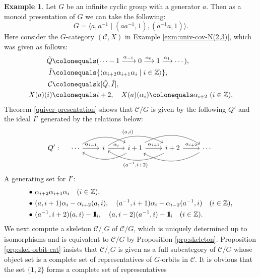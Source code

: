 \documentclass{surv-l}
\numberwithin{equation}{chapter}
\numberwithin{figure}{chapter}
\theoremstyle{plain}
\theoremstyle{definition}
\newtheorem{exm}[thm]{Example}
\theoremstyle{remark}
\newcommand{\id}{1\kern-.25em{\text{{\rm l}}}}
\newcommand{\corbit}{/\!_{_{\mathrm{c}}}}
\newcommand{\Ar}[3]{\ar[from={#1}, to={#2}, #3]}
\begin{document}
\begin{exm}\label{exm:orb-cat-univ-cov-N(2,3)}
Let $G$ be an infinite cyclic group with a generator $a$.
Then as a monoid presentation of $G$ we can take the following:
\[
G = {\langle a, a^{-1} \mid (aa^{-1}, 1), (a^{-1} a, 1) \rangle}.
\]
Here consider the $G$-category $({\mathcal{C}}, X)$ in Example \ref{exm:univ-cov-N(2,3)},
which was given as follows:
\[
\begin{aligned}
\tilde{Q}&\colonequals (\cdots -1\xrightarrow{\alpha_{-1}}0\xrightarrow{\alpha_0}1\xrightarrow{\alpha_1}\cdots),\\
\tilde{I}&\colonequals {\langle\alpha_{i+2}\alpha_{i+1}\alpha_{i} \mid i \in \mathbb{Z} \rangle},\\
{\mathcal{C}}&\colonequals  \Bbbk[\tilde{Q}, \tilde{I}],\\
X(a)(i)&\colonequals  i+2,\quad X(a)(\alpha_i)\colonequals  \alpha_{i+2}\ (i \in \mathbb{Z}).
\end{aligned}
\]
Theorem \ref{quiver-presentation} shows that ${\mathcal{C}}/G$
is given by the following $Q'$ and the ideal $I'$ generated by the relations below:
\[
Q':\quad
\begin{tikzcd}
\cdots & i & i+1 & i+2 & \cdots
\Ar{1-1}{1-2}{"\alpha_{i-1}"}
\Ar{1-2}{1-3}{"\alpha_i"}
\Ar{1-3}{1-4}{"\alpha_{i+1}"}
\Ar{1-4}{1-5}{"\alpha_{i+2}"}
\Ar{1-2}{1-4}{"{(a, i)}", bend left=30}
\Ar{1-4}{1-2}{"{(a^{-1}, i+2)}", bend left=30}
\Ar{1-3}{1-5}{bend left=30}
\Ar{1-5}{1-3}{bend left=30}
\Ar{1-1}{1-3}{bend left=30}
\Ar{1-3}{1-1}{bend left=30}
\end{tikzcd}
\]
A generating set for $I'$:
\[
\begin{aligned}
\bullet\ &\alpha_{i+2}\alpha_{i+1}\alpha_i\quad (i \in \mathbb{Z}),\\
\bullet\ & (a,i+1) \alpha_i - \alpha_{i+2} (a,i), \quad (a^{-1}, i+1) \alpha_i - \alpha_{i-2} (a^{-1}, i)
\quad (i \in \mathbb{Z}),\\
\bullet\ &(a^{-1}, i+2) (a,i) - \id_i,\quad (a,i-2) (a^{-1}, i) - \id_i \quad (i \in \mathbb{Z}).
\end{aligned}
\]
We next compute a skeleton ${\mathcal{C}}\corbit G$ of ${\mathcal{C}}/G$,
which is uniquely determined up to isomorphisms and is equivalent to
${\mathcal{C}}/G$ by Proposition \ref{prp:skeleton}.
Proposition \ref{prp:skel-orbit-cat} insists that
${\mathcal{C}}\corbit G$ is given as a full subcategory of ${\mathcal{C}}/G$ whose object set
is a complete set of representatives of $G$-orbits in ${\mathcal{C}}$.
It is obvious that the set $\{1, 2\}$ forms a complete set of representatives

\end{exm}
\end{document}
